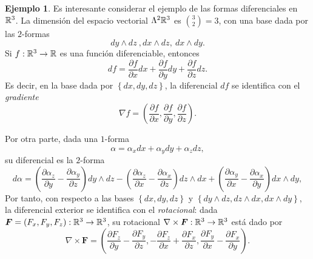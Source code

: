 \documentclass[11pt,a4paper]{amsbook}
\theoremstyle{remark} \newtheorem{rmk}[subsection]{Observación}
\theoremstyle{definition} \newtheorem{defn}[subsection]{Definición}
\theoremstyle{definition} \newtheorem{ex}[subsection]{Ejemplo}
\theoremstyle{definition} \newtheorem{ej}[subsection]{Ejercicio}
\begin{document}
\begin{ex}
  Es interesante considerar el ejemplo de las formas diferenciales en $\mathbb R^3$. La dimensión del espacio vectorial $\Lambda^2 \mathbb R^3$ es ${3 \choose 2} = 3$, con una base dada por las $2$-formas
  \begin{equation*}
dy\wedge dz\ , dx\wedge dz,\ dx \wedge dy.
  \end{equation*}
  Si $f:\mathbb R^3\rightarrow \mathbb R$ es una función diferenciable, entonces
  \begin{equation*}
df = \frac{\partial f}{\partial x} dx + \frac{\partial f}{\partial y} dy + \frac{\partial f}{\partial z} dz .
  \end{equation*}
Es decir, en la base dada por $\left\{ dx,dy,dz \right\}$, la diferencial $df$ se identifica con el \emph{gradiente}
\begin{equation*}
\nabla f = \left(\frac{\partial f}{\partial x}, \frac{\partial f}{\partial y}, \frac{\partial f}{\partial z}\right).
\end{equation*}

Por otra parte, dada una $1$-forma
\begin{equation*}
\alpha = \alpha_x dx + \alpha_y dy + \alpha_z dz,
\end{equation*}
su diferencial es la $2$-forma
\begin{equation*}
d\alpha =\left( \frac{\partial \alpha_z}{\partial y} -\frac{\partial \alpha_y}{\partial z} \right) dy\wedge dz - \left( \frac{\partial \alpha_z}{\partial x} -\frac{\partial \alpha_x}{\partial z} \right) dz\wedge dx + \left( \frac{\partial \alpha_y}{\partial x} -\frac{\partial \alpha_x}{\partial y} \right) dx \wedge dy,
\end{equation*}
Por tanto, con respecto a las bases $\left\{ dx,dy,dz \right\}$ y $\left\{ dy\wedge dz, dz\wedge dx,dx \wedge dy \right\}$, la diferencial exterior se identifica con el \emph{rotacional}: dada $\bm{F}=(F_x,F_y,F_z):\mathbb R^3\rightarrow \mathbb R^3$, su rotacional $\nabla \times \bm{F}: \mathbb R^3\rightarrow \mathbb R^3$ está dado por
\begin{equation*}
\nabla \times \bm{F} = \left(\frac{\partial F_z}{\partial y} -\frac{\partial F_y}{\partial z},-\frac{\partial F_z}{\partial x} +\frac{\partial F_x}{\partial z},  \frac{\partial F_y}{\partial x} -\frac{\partial F_x}{\partial y}  \right).
\end{equation*}


\end{ex}
\end{document}
